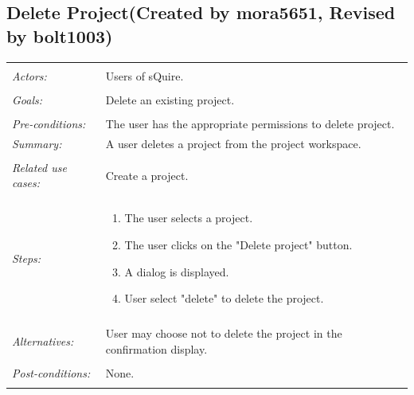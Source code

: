 \documentclass[11pt]{report}
\begin{document}
\subsection{Delete Project(Created by mora5651, Revised by bolt1003)}
\begin{tabular}{ p{2cm} p{12cm} }
\hline
\\
\textit{Actors:} & Users of sQuire.\\
\\
\textit{Goals:} & Delete an existing project. \\
\\
\textit{Pre-conditions:} & The user has the appropriate permissions to delete project. 
\\
\textit{Summary:} & A user deletes a project from the project workspace.\\
\\
\textit{Related use cases:} & Create a project. \\
\\
\textit{Steps:} & \begin{enumerate}
 \item The user selects a project.
 \item The user clicks on the "Delete project" button. 
 \item A dialog is displayed. 
 \item User select "delete" to delete the project. 
 \end{enumerate}\\
 \\
 \textit{Alternatives:} & User may choose not to delete the project in the confirmation display.\\
 \\
 \textit{Post-conditions:} & None. \\
 \\
\hline
\end{tabular}
\end{document}
